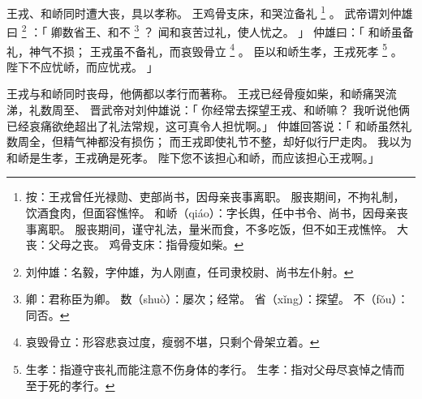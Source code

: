 
\switchcolumn*[\section{}]

王戎、和峤同时遭大丧，具以孝称。
王鸡骨支床，和哭泣备礼%
\footnote{%
    按：王戎曾任光禄勋、吏部尚书，因母亲丧事离职。
        服丧期间，不拘礼制，饮酒食肉，但面容憔悴。
    和峤（qiáo）：字长舆，任中书令、尚书，因母亲丧事离职。
                  服丧期间，谨守礼法，量米而食，不多吃饭，但不如王戎憔悴。
    大丧：父母之丧。
    鸡骨支床：指骨瘦如柴。
}%
。
武帝谓刘仲雄曰%
\footnote{%
    刘仲雄：名毅，字仲雄，为人刚直，任司隶校尉、尚书左仆射。
}%
：「
    卿数省王、和不%
    \footnote{%
        卿：君称臣为卿。
        数（shuò）：屡次；经常。
        省（xǐng）：探望。
        不（fǒu）：同否。
    }%
    ？
    闻和哀苦过礼，使人忧之。
」
仲雄曰：「
    和峤虽备礼，神气不损；
    王戎虽不备礼，而哀毁骨立%
    \footnote{%
        哀毁骨立：形容悲哀过度，瘦弱不堪，只剩个骨架立着。
    }%
    。
    臣以和峤生孝，王戎死孝%
    \footnote{%
        生孝：指遵守丧礼而能注意不伤身体的孝行。
        生孝：指对父母尽哀悼之情而至于死的孝行。
    }%
    。
    陛下不应忧峤，而应忧戎。
」

\switchcolumn


王戎与和峤同时丧母，他俩都以孝行而著称。
王戎已经骨瘦如柴，和峤痛哭流涕，礼数周至、
晋武帝对刘仲雄说：「
 你经常去探望王戎、和峤嘛？
 我听说他俩已经哀痛欲绝超出了礼法常规，这可真令人担忧啊。」
仲雄回答说：「
 和峤虽然礼数周全，但精气神都没有损伤；
 而王戎即使礼节不整，却好似行尸走肉。
 我以为和峤是生孝，王戎确是死孝。
 陛下您不该担心和峤，而应该担心王戎啊。」
